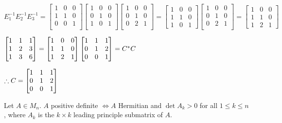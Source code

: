 \documentclass[letterpaper,12pt,fleqn]{article}
\begin{document}
\begin{example}
  $E_1^{-1}E_2^{-1}E_3^{-1}=
  \begin{bmatrix}
  1 & 0 & 0 \\
  1 & 1 & 0 \\
  0 & 0 & 1 \\
  \end{bmatrix}
  \begin{bmatrix}
  1 & 0 & 0 \\
  0 & 1 & 0 \\
  1 & 0 & 1 \\
  \end{bmatrix}
  \begin{bmatrix}
  1 & 0 & 0 \\
  0 & 1 & 0 \\
  0 & 2 & 1 \\
  \end{bmatrix}=
  \begin{bmatrix}
    1 & 0 & 0 \\
    1 & 1 & 0 \\
    1 & 0 & 1
  \end{bmatrix}
  \begin{bmatrix}
  1 & 0 & 0 \\
  0 & 1 & 0 \\
  0 & 2 & 1 \\
  \end{bmatrix}=
  \begin{bmatrix}
    1 & 0 & 0 \\
    1 & 1 & 0 \\
    1 & 2 & 1
  \end{bmatrix}$

  $\begin{bmatrix} 1 & 1 & 1 \\ 1 & 2 & 3 \\ 1 & 3 & 6 \end{bmatrix}=\begin{bmatrix}
    1 & 0 & 0 \\
    1 & 1 & 0 \\
    1 & 2 & 1
  \end{bmatrix}\begin{bmatrix} 1 & 1 & 1 \\ 0 & 1 & 2 \\ 0 & 0 & 1 \end{bmatrix}=C^*C$

  $\therefore C=\begin{bmatrix} 1 & 1 & 1 \\ 0 & 1 & 2 \\ 0 & 0 & 1 \end{bmatrix}$
\end{example}

\begin{theorem}
  Let $A\in M_n$. $A$ positive definite $\iff A$ Hermitian and
  $\det A_k>0$ for all $1\le k\le n$, where $A_k$ is the $k\times k$ leading
  principle submatrix of $A$.
\end{theorem}
\end{document}
